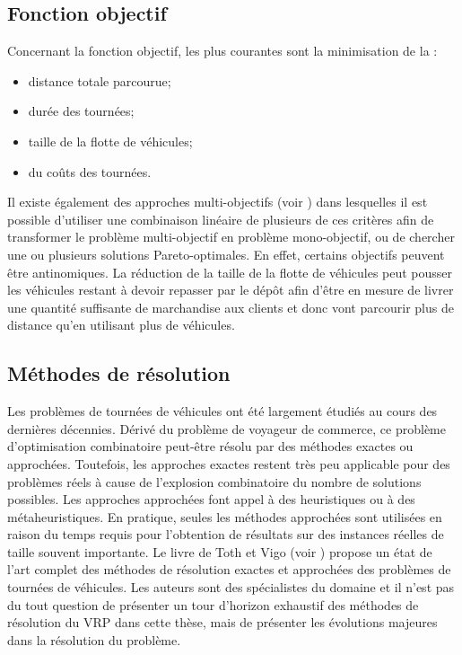 \subsection{Fonction objectif}

Concernant la fonction objectif, les plus courantes sont la minimisation de la : 
\begin{itemize}
 \item distance totale parcourue;
 \item durée des tournées;
 \item taille de la flotte de véhicules;
 \item du coûts des tournées.
\end{itemize}

Il existe également des approches multi-objectifs (voir \cite{Talbi2001}) dans lesquelles il est possible d'utiliser une combinaison linéaire de plusieurs de ces critères afin de transformer le problème multi-objectif en problème mono-objectif, ou de chercher une ou plusieurs solutions Pareto-optimales. En effet, certains objectifs peuvent être antinomiques. La réduction de la taille de la flotte de véhicules peut pousser les véhicules restant à devoir repasser par le dépôt afin d'être en mesure de livrer une quantité suffisante de marchandise aux clients et donc vont parcourir plus de distance qu'en utilisant plus de véhicules. 

\subsection{Méthodes de résolution}
Les problèmes de tournées de véhicules ont été largement étudiés au cours des dernières décennies. Dérivé du problème de voyageur de commerce, ce problème d'optimisation combinatoire peut-être résolu par des méthodes exactes ou approchées. Toutefois, les approches exactes restent très peu applicable pour des problèmes réels à cause de l'explosion combinatoire du nombre de solutions possibles. Les approches approchées font appel à des heuristiques ou à des métaheuristiques. En pratique, seules les méthodes approchées sont utilisées en raison du temps requis pour l'obtention de résultats sur des instances réelles de taille souvent importante. Le livre de Toth et Vigo (voir \cite{Toth2001}) propose un état de l'art complet des méthodes de résolution exactes et approchées des problèmes de tournées de véhicules. Les auteurs sont des spécialistes du domaine et il n'est pas du tout question de présenter un tour d'horizon exhaustif des méthodes de résolution du VRP dans cette thèse, mais de présenter les évolutions 
majeures dans la résolution du problème.

